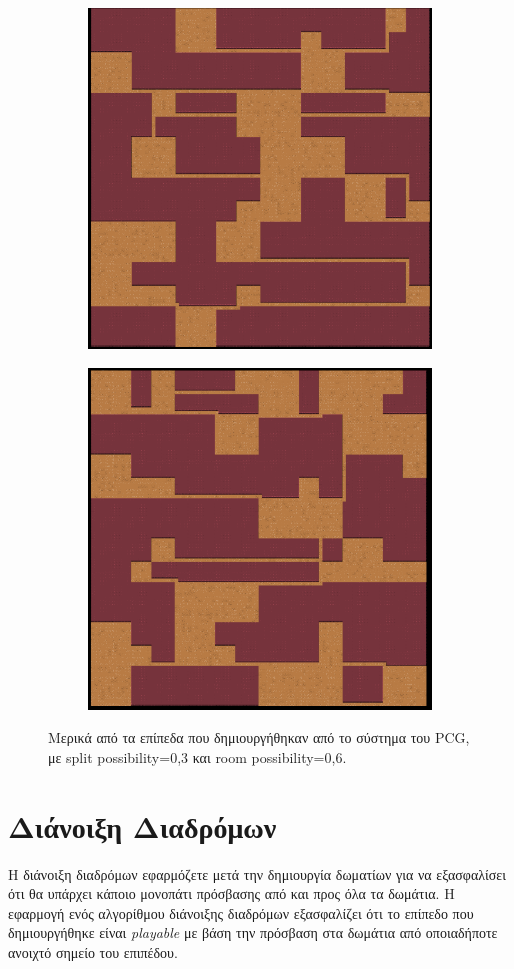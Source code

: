 \begin{figure}[H]
\begin{subfigure}{.5\textwidth}
  \includegraphics[width=.8\linewidth]{../images/pcg_quadtree/pcg5.png}
  \label{fig:sfig1}
\end{subfigure}%
\begin{subfigure}{.5\textwidth}
  \centering
  \includegraphics[width=.8\linewidth]{../images/pcg_quadtree/pcg6.png}
  \label{fig:sfig2}
\end{subfigure}
\caption{Μερικά από τα επίπεδα που δημιουργήθηκαν από το σύστημα του PCG, με split possibility=0,3 και room possibility=0,6.}
\label{fig:fig}
\end{figure}


\section{Διάνοιξη Διαδρόμων}
Η διάνοιξη διαδρόμων εφαρμόζετε μετά την δημιουργία δωματίων για να εξασφαλίσει ότι θα υπάρχει κάποιο μονοπάτι πρόσβασης από και προς όλα τα δωμάτια. Η εφαρμογή ενός αλγορίθμου διάνοιξης διαδρόμων εξασφαλίζει ότι το επίπεδο που δημιουργήθηκε είναι \textit{playable} με βάση την πρόσβαση στα δωμάτια από οποιαδήποτε ανοιχτό σημείο του επιπέδου.

